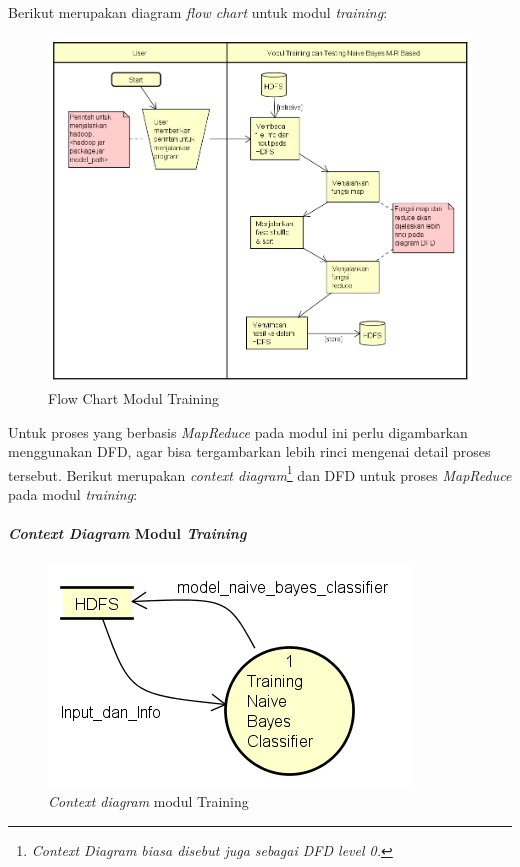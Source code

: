 Berikut merupakan diagram \textit{flow chart} untuk modul \textit{training}:

\begin{figure}[H]
	\centering
	\includegraphics[scale=0.65]{Diagram/Flowchart_Training_Testing_MR}
	\caption[Flow Chart Modul Training]{Flow Chart Modul Training}
	\label{fig:Flow Chart Modul Training}
\end{figure}

Untuk proses yang berbasis \textit{MapReduce} pada modul ini perlu digambarkan menggunakan DFD, agar bisa tergambarkan lebih rinci mengenai detail proses tersebut. Berikut merupakan \textit{context diagram}\footnote{\textit{Context Diagram biasa disebut juga sebagai DFD level 0.}} dan DFD untuk proses \textit{MapReduce} pada modul \textit{training}:

\paragraph{\textit{Context Diagram} Modul \textit{Training}}
\begin{figure}[H]
	\label{DFD_0_Training}
	\centering
	\includegraphics[scale=0.65]{Diagram/DFD_0_Training}
	\caption[\textit{Context diagram} modul Training]{\textit{Context diagram} modul Training}
	\label{fig:Context diagram modul Training}
\end{figure}

